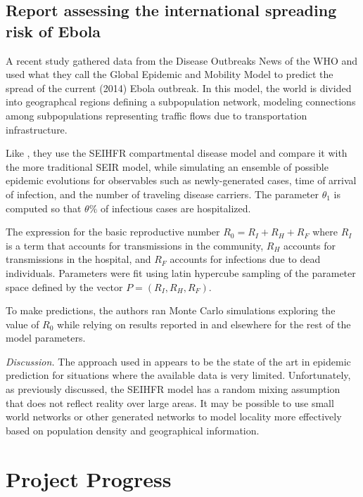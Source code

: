 \documentclass[10pt, journal,onecolumn]{IEEEtran}
\begin{document}
\subsection{\textbf{Report assessing the international spreading risk of Ebola \citep{gomes2014assessing}}}

A recent study \citep{gomes2014assessing} gathered data from the Disease Outbreaks News of
the WHO and used what they call the Global Epidemic and Mobility Model to predict the spread of the
current (2014) Ebola outbreak. In this model, the world is divided into geographcal regions defining a
subpopulation network, modeling connections among subpopulations representing traffic flows due to
transportation infrastructure.

Like \citep{legrand2007understanding}, they use the SEIHFR compartmental disease model and compare
it with the more traditional SEIR model, while simulating
an ensemble of possible epidemic evolutions for observables such as newly-generated
cases, time of arrival of infection, and the number of traveling disease carriers.
The parameter $\theta_1$ is computed so that $\theta\%$ of infectious cases
are hospitalized.

The expression for the basic reproductive number $R_0 = R_I + R_H + R_F$
where $R_I$ is a term that accounts for transmissions in the community, $R_H$ accounts for
transmissions in the hospital, and $R_F$ accounts for infections due to dead individuals.
Parameters were fit using latin hypercube sampling of the parameter space defined by the
vector $P = (R_I, R_H, R_F)$.

To make predictions, the authors ran Monte Carlo simulations exploring the value of $R_0$ while relying on results reported
in \citep{legrand2007understanding} and elsewhere for the rest of the model parameters.

\textit{Discussion.} The approach used in \citep{legrand2007understanding} appears to be the state of the art in epidemic prediction for
situations where the available data is very limited. Unfortunately, as previously discussed, the
SEIHFR model has a random mixing assumption that does not reflect reality over large areas.
It may be possible to use small world networks or other generated networks to model locality
more effectively based on population density and geographical information.



\section{Project Progress}
\label{sec:ProjectProposal}
\end{document}
